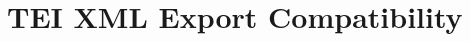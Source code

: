 \documentclass[12pt,a4paper]{article}
\begin{document}
\section{TEI XML Export Compatibility}\label{sec:tei}
\end{document}
